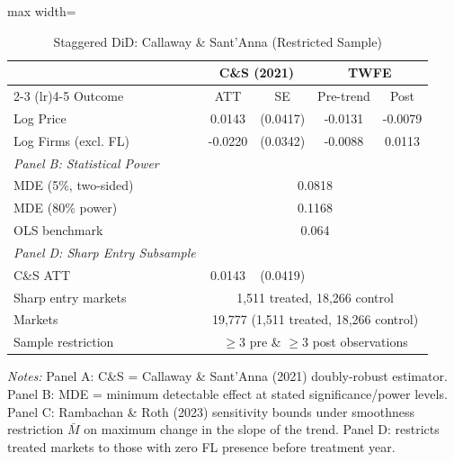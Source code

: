 \begin{table}[htbp]
\centering
\caption{Staggered DiD: Callaway \& Sant'Anna (Restricted Sample)}
\label{tab:did_revised}
\begin{adjustbox}{max width=\textwidth}
\begin{threeparttable}
\small
\begin{tabular}{lcccc}
\toprule
 & \multicolumn{2}{c}{C\&S (2021)} & \multicolumn{2}{c}{TWFE} \\
\cmidrule(lr){2-3} \cmidrule(lr){4-5}
Outcome & ATT & SE & Pre-trend & Post \\
\midrule
Log Price & 0.0143 & (0.0417) & -0.0131 & -0.0079 \\
Log Firms (excl. FL) & -0.0220 & (0.0342) & -0.0088 & 0.0113 \\
\midrule
\textit{Panel B: Statistical Power} & & & & \\
MDE (5\%, two-sided) & \multicolumn{4}{c}{0.0818} \\
MDE (80\% power) & \multicolumn{4}{c}{0.1168} \\
OLS benchmark & \multicolumn{4}{c}{0.064} \\
\midrule
\textit{Panel D: Sharp Entry Subsample} & & & & \\
C\&S ATT & 0.0143 & (0.0419) & & \\
Sharp entry markets & \multicolumn{4}{c}{1,511 treated, 18,266 control} \\
\midrule
Markets & \multicolumn{4}{c}{19,777 (1,511 treated, 18,266 control)} \\
Sample restriction & \multicolumn{4}{c}{$\geq$3 pre \& $\geq$3 post observations} \\
\bottomrule
\end{tabular}
\begin{tablenotes}
\small
\item \textit{Notes:} Panel A: C\&S = Callaway \& Sant'Anna (2021) doubly-robust estimator.
Panel B: MDE = minimum detectable effect at stated significance/power levels.
Panel C: Rambachan \& Roth (2023) sensitivity bounds under smoothness restriction $\bar{M}$
on maximum change in the slope of the trend.
Panel D: restricts treated markets to those with zero FL presence before treatment year.
\end{tablenotes}
\end{threeparttable}
\end{adjustbox}
\end{table}

